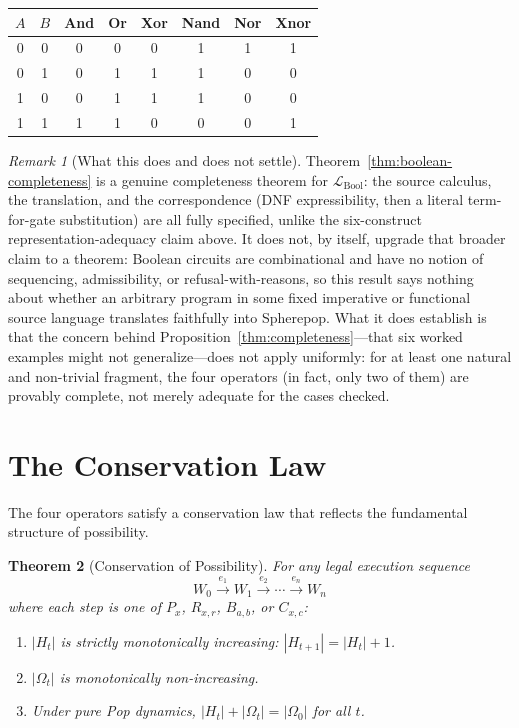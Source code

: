 \documentclass[12pt, a4paper, openany]{book}
\theoremstyle{plain}
\newtheorem{theorem}{Theorem}[chapter]
\theoremstyle{definition}
\theoremstyle{remark}
\newtheorem{remark}[theorem]{Remark}
\begin{document}
\begin{center}
\begin{tabular}{cccccccc}
\toprule
$A$ & $B$ & And & Or & Xor & Nand & Nor & Xnor \\
\midrule
0 & 0 & 0 & 0 & 0 & 1 & 1 & 1 \\
0 & 1 & 0 & 1 & 1 & 1 & 0 & 0 \\
1 & 0 & 0 & 1 & 1 & 1 & 0 & 0 \\
1 & 1 & 1 & 1 & 0 & 0 & 0 & 1 \\
\bottomrule
\end{tabular}
\end{center}

\begin{remark}[What this does and does not settle]
Theorem~\ref{thm:boolean-completeness} is a genuine completeness theorem for
$\mathcal{L}_{\mathrm{Bool}}$: the source calculus, the translation, and the
correspondence (DNF expressibility, then a literal term-for-gate substitution)
are all fully specified, unlike the six-construct representation-adequacy
claim above. It does not, by itself, upgrade that broader claim to a theorem:
Boolean circuits are combinational and have no notion of sequencing,
admissibility, or refusal-with-reasons, so this result says nothing about
whether an arbitrary program in some fixed imperative or functional source
language translates faithfully into Spherepop. What it does establish is that
the concern behind Proposition~\ref{thm:completeness}---that six worked
examples might not generalize---does not apply uniformly: for at least one
natural and non-trivial fragment, the four operators (in fact, only two of
them) are provably complete, not merely adequate for the cases checked.
\end{remark}

\section{The Conservation Law}

The four operators satisfy a conservation law that reflects the fundamental
structure of possibility.

\begin{theorem}[Conservation of Possibility]
\label{thm:conservation}
For any legal execution sequence
\[
W_0 \xrightarrow{e_1} W_1 \xrightarrow{e_2} \cdots \xrightarrow{e_n} W_n
\]
where each step is one of $P_x$, $R_{x,r}$, $B_{a,b}$, or $C_{x,c}$:
\begin{enumerate}
\item $|H_t|$ is strictly monotonically increasing: $|H_{t+1}| = |H_t| + 1$.
\item $|\Omega_t|$ is monotonically non-increasing.
\item Under pure Pop dynamics, $|H_t| + |\Omega_t| = |\Omega_0|$ for all $t$.
\end{enumerate}
\end{theorem}
\end{document}
